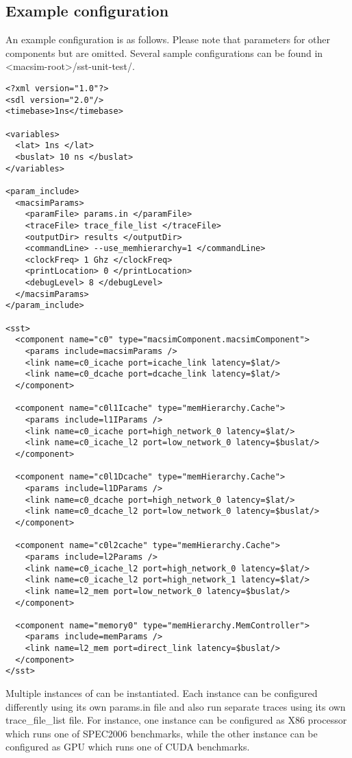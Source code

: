 \subsection{Example configuration}

An example configuration is as follows.
Please note that parameters for other components but \SIM are omitted.
Several sample configurations can be found in <macsim-root>/sst-unit-test/.

\begin{Verbatim}
<?xml version="1.0"?>
<sdl version="2.0"/>
<timebase>1ns</timebase>

<variables>
  <lat> 1ns </lat>
  <buslat> 10 ns </buslat>
</variables>

<param_include>
  <macsimParams>
    <paramFile> params.in </paramFile>
    <traceFile> trace_file_list </traceFile>
    <outputDir> results </outputDir>
    <commandLine> --use_memhierarchy=1 </commandLine>
    <clockFreq> 1 Ghz </clockFreq>
    <printLocation> 0 </printLocation>
    <debugLevel> 8 </debugLevel>
  </macsimParams>
</param_include>

<sst>
  <component name="c0" type="macsimComponent.macsimComponent">
    <params include=macsimParams />
    <link name=c0_icache port=icache_link latency=$lat/>
    <link name=c0_dcache port=dcache_link latency=$lat/>
  </component>

  <component name="c0l1Icache" type="memHierarchy.Cache">
    <params include=l1IParams />
    <link name=c0_icache port=high_network_0 latency=$lat/>
    <link name=c0_icache_l2 port=low_network_0 latency=$buslat/>
  </component>

  <component name="c0l1Dcache" type="memHierarchy.Cache">
    <params include=l1DParams />
    <link name=c0_dcache port=high_network_0 latency=$lat/>
    <link name=c0_dcache_l2 port=low_network_0 latency=$buslat/>
  </component>

  <component name="c0l2cache" type="memHierarchy.Cache">
    <params include=l2Params />
    <link name=c0_icache_l2 port=high_network_0 latency=$lat/>
    <link name=c0_icache_l2 port=high_network_1 latency=$lat/>
    <link name=l2_mem port=low_network_0 latency=$buslat/>
  </component>

  <component name="memory0" type="memHierarchy.MemController">
    <params include=memParams />
    <link name=l2_mem port=direct_link latency=$buslat/>
  </component>
</sst>
\end{Verbatim}
Multiple instances of \SIM can be instantiated.
Each instance can be configured differently using its own params.in file and also run separate traces using its own trace\_file\_list file.
For instance, one \SIM instance can be configured as X86 processor which runs one of SPEC2006 benchmarks, while the other \SIM instance can be configured as GPU which runs one of CUDA benchmarks. 

